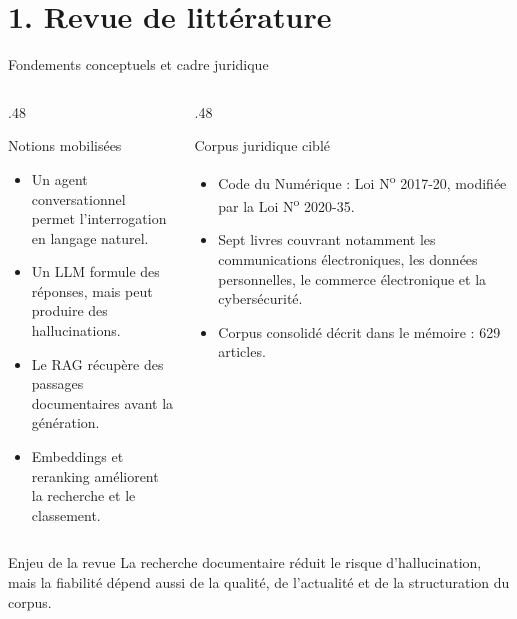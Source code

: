 \documentclass[aspectratio=169,10pt]{beamer}
\begin{document}
\section{1. Revue de littérature}
\begin{frame}{Fondements conceptuels et cadre juridique}
  \begin{columns}[T,onlytextwidth]
    \begin{column}{.48\textwidth}
      \begin{block}{Notions mobilisées}
        \begin{itemize}\setlength\itemsep{0.35em}
          \item Un agent conversationnel permet l'interrogation en langage naturel.
          \item Un LLM formule des réponses, mais peut produire des hallucinations.
          \item Le RAG récupère des passages documentaires avant la génération.
          \item Embeddings et reranking améliorent la recherche et le classement.
        \end{itemize}
      \end{block}
    \end{column}
    \begin{column}{.48\textwidth}
      \begin{block}{Corpus juridique ciblé}
        \begin{itemize}\setlength\itemsep{0.35em}
          \item Code du Numérique : Loi N\textsuperscript{o} 2017-20, modifiée par la Loi N\textsuperscript{o} 2020-35.
          \item Sept livres couvrant notamment les communications électroniques, les données personnelles, le commerce électronique et la cybersécurité.
          \item Corpus consolidé décrit dans le mémoire : 629 articles.
        \end{itemize}
      \end{block}
    \end{column}
  \end{columns}
  \begin{alertblock}{Enjeu de la revue}
    La recherche documentaire réduit le risque d'hallucination, mais la fiabilité dépend aussi de la qualité, de l'actualité et de la structuration du corpus.
  \end{alertblock}
\end{frame}
\end{document}
